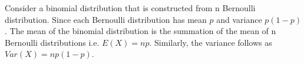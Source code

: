 \documentclass[12pt, oneside]{article}
\begin{document}
Consider a binomial distribution that is constructed from n Bernoulli distribution. Since each Bernoulli distribution has mean $p$ and variance $p(1-p)$. The mean of the binomial distribution is the summation of the mean of n Bernoulli distributions i.e. $E(X)=np$. Similarly, the variance follows as $Var(X)=np(1-p)$.
\end{document}
